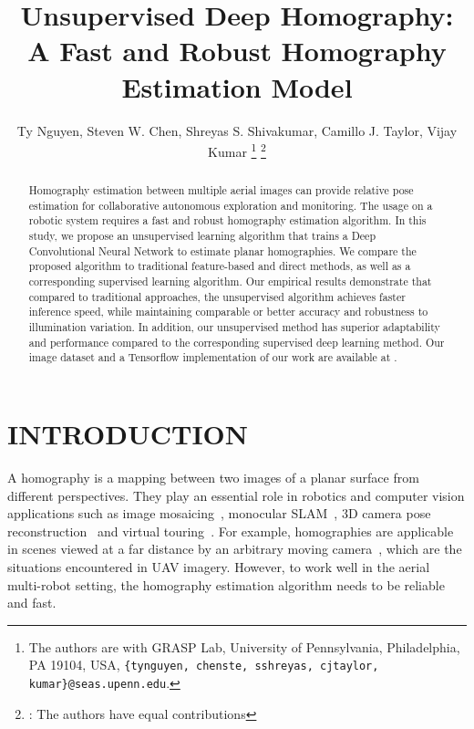 \documentclass[letterpaper, 10 pt, conference]{ieeeconf}
\begin{document}
\title{Unsupervised Deep Homography: A Fast and Robust Homography Estimation Model}


\author{Ty Nguyen, Steven W. Chen, Shreyas S. Shivakumar, Camillo J. Taylor, Vijay Kumar \thanks{The authors are with GRASP Lab, University of Pennsylvania, Philadelphia, PA 19104, USA, {\tt\small\{tynguyen, chenste, sshreyas, cjtaylor, kumar\}@seas.upenn.edu}.}
\thanks{: The authors have equal contributions}
}





\maketitle


\begin{abstract}
Homography estimation between multiple aerial images can provide relative pose estimation for collaborative autonomous exploration and monitoring. The usage on a robotic system requires a fast and robust homography estimation algorithm. In this study, we propose an unsupervised learning algorithm that trains a Deep Convolutional Neural Network to estimate planar homographies. We compare the proposed algorithm to traditional feature-based and direct methods, as well as a corresponding supervised learning algorithm. Our empirical results demonstrate that compared to traditional approaches, the unsupervised algorithm achieves faster inference speed, while maintaining comparable or better accuracy and robustness to illumination variation. In addition, our unsupervised method has superior adaptability and performance compared to the corresponding supervised deep learning method. Our image dataset and a Tensorflow implementation of our work are available at . 
\end{abstract}



\section{INTRODUCTION}
A homography is a mapping between two images of a planar surface from different perspectives. They play an essential role in robotics and computer vision applications such as image mosaicing~\cite{brown2003recognising}, monocular SLAM~\cite{shridhar2015monocular}, 3D camera pose reconstruction~\cite{zhang19963d} and virtual touring~\cite{pan2004easy, tang2007self}. For example, homographies are applicable in scenes viewed at a far distance by an arbitrary moving camera~\cite{capel2004image}, which are the situations encountered in UAV imagery. However, to work well in the aerial multi-robot setting, the homography estimation algorithm needs to be reliable and fast. 
\end{document}
